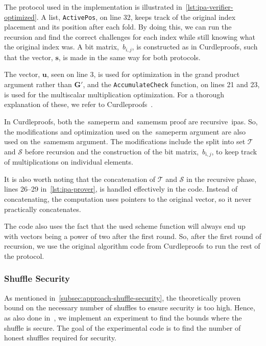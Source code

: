 The protocol used in the implementation is illustrated in~\autoref{lst:ipa-verifier-optimized}.
A list, \texttt{ActivePos}, on line 32, keeps track of the original index placement and its position after each fold.
By doing this, we can run the recursion and find the correct challenges for each index while still knowing what the original index was.
A bit matrix,~$b_{i,j}$, is constructed as in Curdleproofs, such that the vector, $\mathbf{s}$, is made in the same way for both protocols.

The vector, $\mathbf{u}$, seen on line 3, is used for optimization in the grand product argument rather than $\mathbf{G'}$, and the \texttt{AccumulateCheck} function, on lines 21 and 23, is used for the multiscalar multiplication optimization.
For a thorough explanation of these, we refer to Curdleproofs~\cite{Curdleproofs}.

In Curdleproofs, both the~\gls{sameperm} and~\gls{samemsm} proof are recursive~\glspl{ipa}.
So, the modifications and optimization used on the~\gls{sameperm} argument are also used on the~\gls{samemsm} argument.
The modifications include the split into set $\mathbf{\mathcal{T}}$ and $\mathbf{\mathcal{S}}$ before recursion and the construction of the bit matrix,~$b_{i,j}$, to keep track of multiplications on individual elements.

It is also worth noting that the concatenation of $\mathbf{\mathcal{T}}$ and $\mathbf{\mathcal{S}}$ in the recursive phase, lines 26--29 in~\autoref{lst:ipa-prover}, is handled effectively in the code.
Instead of concatenating, the computation uses pointers to the original vector, so it never practically concatenates.

The code also uses the fact that the used scheme function will always end up with vectors being a power of two after the first round.
So, after the first round of recursion, we use the original algorithm code from Curdleproofs to run the rest of the protocol.

\subsubsection{Shuffle Security}
As mentioned in~\autoref{subsec:approach-shuffle-security}, the theoretically proven bound on the necessary number of shuffles to ensure security is too high.
Hence, as also done in~\cite{cryptoeprint:2022/560}, we implement an experiment to find the bounds where the shuffle is secure.
The goal of the experimental code is to find the number of honest shuffles required for security.

